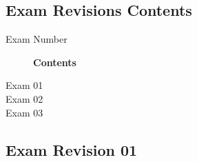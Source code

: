 \subsection{Exam Revisions Contents}
\begin{description}
\item [Exam Number] \textbf{Contents}
\item [Exam 01] 
\item [Exam 02] 
\item [Exam 03] 
\end{description}


\subsection{Exam Revision 01}




\pagebreak
